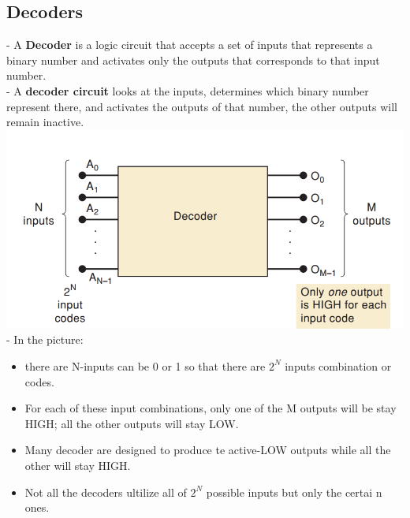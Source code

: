\documentclass[12pt]{article}
\begin{document}
\subsection{Decoders}
- A \textbf{Decoder} is a logic circuit that accepts a set of inputs that represents a binary number and activates only the outputs that corresponds to that input number. \\
- A \textbf{decoder circuit} looks at the inputs, determines which binary number represent there, and activates the outputs of that number, the other outputs will remain inactive. \\
\includegraphics[scale = 0.7]{hinh57}
\bigbreak
- In the picture: \\
\begin{itemize}
 \item there are N-inputs can be 0 or 1 so that there are $2^{N}$ inputs combination or codes.
 \item For each of these input combinations, only one of the M outputs will be stay HIGH; all the other outputs will stay LOW.
 \item Many decoder are designed to produce te active-LOW outputs while all the other will stay HIGH.
 \item Not all the decoders ultilize all of $2^{N}$ possible inputs but only the certai n ones.
\end{itemize}
\end{document}
